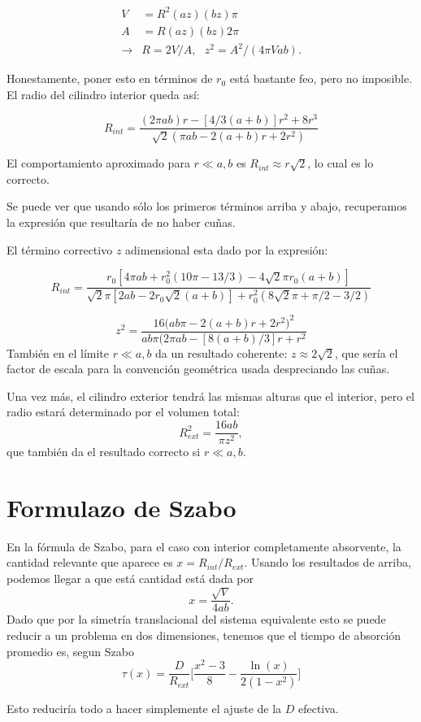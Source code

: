 \documentclass[letterpaperr,12pt]{article}
\begin{document}
\begin{align}
V &= R^2 ( a z)( b z) \pi \\
A &= R ( a z)( b z) 2  \pi \\
\rightarrow & R= 2V/A, \text{ } z^2=A^2/( 4\pi V a b).  
\end{align}

Honestamente, poner esto en términos de $r_0$ está bastante feo, pero no imposible.
El radio del cilindro interior queda así:

\begin{equation}
R_{int}=\frac{ (2 \pi ab)r - [4/3 (a+b)]r^2 +8r^3}
{\sqrt{2}(\pi ab -2(a+b) r +2r^2)}
\end{equation}

El comportamiento aproximado para $r\ll a,b$ es $R_{int} \approx r\sqrt{2}$, lo cual
es lo correcto. 

Se puede ver que usando sólo los primeros términos arriba y abajo, 
recuperamos la expresión
que resultaría de no haber cuñas. 

El término correctivo $z$ adimensional esta dado por la expresión:

\begin{equation}
R_{int}=\frac{r_0 [ 4 \pi ab + r_0 ^2 (10 \pi -13/3) - 4 \sqrt{2}\pi r_0 (a+b)]}
{\sqrt{2}\pi[2 ab- 2r_0 \sqrt{2} (a+b)] +r_0^2 (8\sqrt{2} \pi + \pi/2 -3/2)}
\end{equation}

\begin{equation}
z^2=\frac{16 \big( ab\pi -2(a+b)r+2r^2 \big)^2}
{ a b \pi (2\pi ab -[8(a+b)/3]r+r^2}
\end{equation}
También en el límite $r\ll a,b$ da un resultado coherente: $z\approx 2\sqrt{2}$,
que sería el factor de escala para la convención geométrica usada despreciando
las cuñas.

Una vez más, el cilindro exterior tendrá las mismas alturas que el interior,
pero el radio estará determinado por el volumen total:
\begin{equation}
R_{ext}^2=\frac{16ab}{\pi z^2},
\end{equation}
que también da el resultado correcto si $r\ll a,b$.


\section{Formulazo de Szabo}

En la fórmula de Szabo, para el caso con interior completamente
absorvente, la cantidad relevante que aparece es $x=R_{int}/R_{ext}$.
Usando los resultados de arriba, podemos llegar a que está cantidad está
dada por
\begin{equation}
x=\frac{\sqrt{V}}{4ab}.
\end{equation}
Dado que por la simetría translacional del sistema equivalente
esto se puede reducir a un problema en dos dimensiones, tenemos
que el tiempo de absorción promedio es, segun Szabo
\begin{equation}
\tau(x)=\frac{D}{R_{ext}}
\bigg[ 
\frac{x^2-3}{8}-\frac{\ln (x)}{2(1-x^2)}\bigg] 
\end{equation}

Esto reduciría todo a hacer simplemente el ajuste de la $D$ efectiva.
\end{document}
